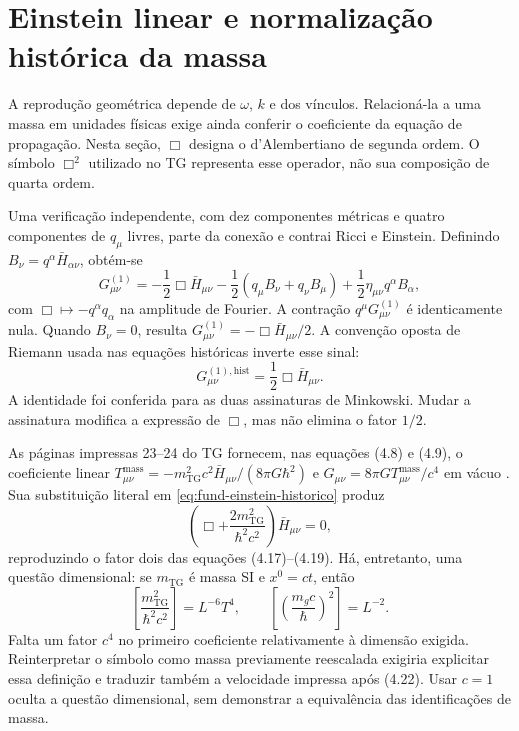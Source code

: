 \section{Einstein linear e normalização histórica da massa}
\label{sec:fund-normalizacao}

A reprodução geométrica depende de \(\omega\), \(k\) e dos vínculos.
Relacioná-la a uma massa em unidades físicas exige ainda conferir o
coeficiente da equação de propagação. Nesta seção, \(\Box\) designa o
d'Alembertiano de segunda ordem. O símbolo \(\Box^2\) utilizado no TG
representa esse operador, não sua composição de quarta ordem.

Uma verificação independente, com dez componentes métricas e quatro
componentes de \(q_\mu\) livres, parte da conexão e contrai Ricci e
Einstein. Definindo \(B_\nu=q^\alpha\bar H_{\alpha\nu}\), obtém-se
\begin{equation}
 G_{\mu\nu}^{(1)}=-\frac12\Box\bar H_{\mu\nu}
 -\frac12(q_\mu B_\nu+q_\nu B_\mu)
 +\frac12\eta_{\mu\nu}q^\alpha B_\alpha,
 \label{eq:fund-einstein-geral}
\end{equation}
com \(\Box\mapsto-q^\alpha q_\alpha\) na amplitude de Fourier.
A contração \(q^\mu G_{\mu\nu}^{(1)}\) é identicamente nula.
Quando \(B_\nu=0\), resulta
\(G_{\mu\nu}^{(1)}=-\Box\bar H_{\mu\nu}/2\). A convenção oposta
de Riemann usada nas equações históricas inverte esse sinal:
\begin{equation}
 G_{\mu\nu}^{(1),\mathrm{hist}}=
       \frac12\Box\bar H_{\mu\nu}.
 \label{eq:fund-einstein-historico}
\end{equation}
A identidade foi conferida para as duas assinaturas de Minkowski.
Mudar a assinatura modifica a expressão de \(\Box\), mas não elimina
o fator \(1/2\).

As páginas impressas 23--24 do TG fornecem, nas equações (4.8) e
(4.9), o coeficiente linear
\(T_{\mu\nu}^{\mathrm{mass}}
=-m_{\mathrm{TG}}^2c^2\bar H_{\mu\nu}/(8\pi G\hbar^2)\)
e \(G_{\mu\nu}=8\pi GT_{\mu\nu}^{\mathrm{mass}}/c^4\) em vácuo
\autocite{tg2003}. Sua substituição literal em
\eqref{eq:fund-einstein-historico} produz
\begin{equation}
 \left(\Box+\frac{2m_{\mathrm{TG}}^2}{\hbar^2c^2}\right)
 \bar H_{\mu\nu}=0,
 \label{eq:fund-tg-literal}
\end{equation}
reproduzindo o fator dois das equações (4.17)--(4.19). Há, entretanto,
uma questão dimensional: se \(m_{\mathrm{TG}}\) é massa SI e
\(x^0=ct\), então
\begin{equation}
 \left[\frac{m_{\mathrm{TG}}^2}{\hbar^2c^2}\right]=L^{-6}T^4,
 \qquad
 \left[\left(\frac{m_gc}{\hbar}\right)^2\right]=L^{-2}.
 \label{eq:fund-dimensoes-massa}
\end{equation}
Falta um fator \(c^4\) no primeiro coeficiente relativamente à dimensão
exigida. Reinterpretar o símbolo como massa previamente reescalada
exigiria explicitar essa definição e traduzir também a velocidade
impressa após (4.22). Usar \(c=1\) oculta a questão dimensional,
sem demonstrar a equivalência das identificações de massa.

